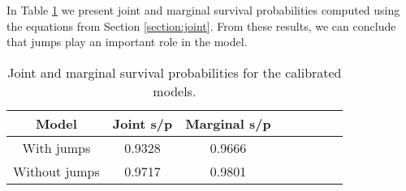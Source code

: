 In Table \ref{table:results} we present joint and marginal survival probabilities computed using the equations from Section \ref{section:joint}. From these results, we can conclude that jumps play an important role in the model.
\begin{table}[H]
	\begin{center}
		\begin{tabular}{|c | c | c | c | c | c | c | c |}
			\hline
			Model &Joint s/p & Marginal s/p   \\ 
			\hline
			With jumps & 0.9328 & 0.9666 \\
			Without jumps & 0.9717 & 0.9801 \\
			\hline
		\end{tabular}
		\caption{Joint and marginal survival probabilities for the calibrated models.}
		\label{table:results}	
	\end{center}
\end{table}



%
%
%
%
%
%

%
%
%
%

